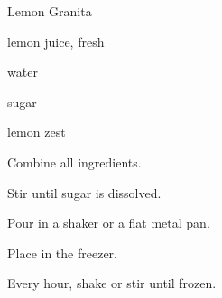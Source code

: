 \begin{recipe}{Lemon Granita}{}{}

\begin{ingredients}
\item \C{\twothird} lemon juice, fresh
\item \C{1\third} water
\item \C{\half} sugar
\item {} lemon zest
\end{ingredients}

\begin{directions}
\item Combine all ingredients.
\item Stir until sugar is dissolved.
\item Pour in a shaker or a flat metal pan.
\item Place in the freezer.
\item Every hour, shake or stir until frozen.
\end{directions}

\end{recipe}

